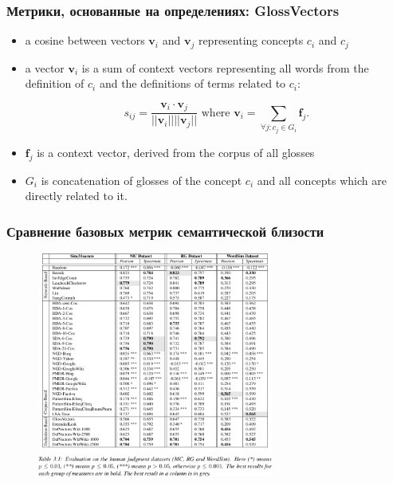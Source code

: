 \begin{frame}
\frametitle{Метрики, основанные на определениях: GlossVectors}


\begin{itemize}
\item a cosine between vectors $\mathbf{v}_i$ and $\mathbf{v}_j$ representing concepts $c_i$ and $c_j$

\item a vector $\mathbf{v}_i$ is a sum of context vectors representing all words from the definition of $c_i$ and the definitions of terms related to $c_i$:

$$
s_{ij} =  \frac{\mathbf{v}_i \cdot \mathbf{v}_j}{||\mathbf{v}_i|| ||\mathbf{v}_j||} \text{ where } \mathbf{v}_i = \sum_{ \forall j : c_j \in G_i  } \mathbf{f}_j.
$$

\item $\mathbf{f}_j$ is a context vector, derived from the corpus of all glosses 
\item $G_i$ is concatenation of glosses of the concept $c_i$ and all concepts which are directly related to it.

\end{itemize}

\end{frame}





\begin{frame}
\frametitle{Сравнение базовых метрик семантической близости}



\begin{figure}
\includegraphics[width=0.69\textwidth]{./figures/overview-table1}
\end{figure}
   
\end{frame}





